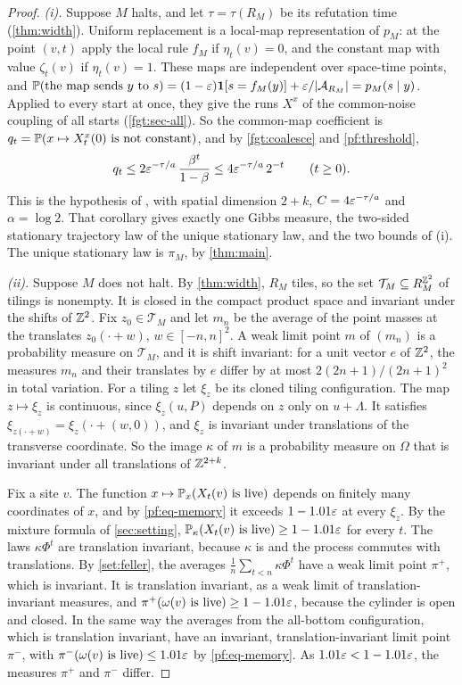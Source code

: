 \begin{proof}
\emph{(i).} Suppose $M$ halts, and let $\tau=\tau(R_M)$ be its refutation time (\cref{thm:width}). Uniform replacement is a local-map representation of $p_M$: at the point $(v,t)$ apply the local rule $f_M$ if $\eta_t(v)=0$, and the constant map with value $\zeta_t(v)$ if $\eta_t(v)=1$. These maps are independent over space-time points, and $\mathbb{P}(\text{the map sends }y\text{ to }s)=(1-\varepsilon)\mathbf 1[s=f_M(y)]+\varepsilon/|\mathcal{A}_{R_M}|=p_M(s\mid y)$. Applied to every start at once, they give the runs $X^x$ of the common-noise coupling of all starts (\cref{fgt:sec-all}). So the common-map coefficient is $q_t=\mathbb{P}(x\mapsto X^x_t(0)\text{ is not constant})$, and by \cref{fgt:coalesce} and \cref{pf:threshold},
\[
q_t\le2\varepsilon^{-\tau/a}\,\frac{\beta^t}{1-\beta}\le4\varepsilon^{-\tau/a}\,2^{-t}\qquad(t\ge0).
\]
This is the hypothesis of \cite[Corollary~13.7]{DM26}, with spatial dimension $2+k$, $C=4\varepsilon^{-\tau/a}$ and $\alpha=\log2$. That corollary gives exactly one Gibbs measure, the two-sided stationary trajectory law of the unique stationary law, and the two bounds of (i). The unique stationary law is $\pi_M$, by \cref{thm:main}.

\emph{(ii).} Suppose $M$ does not halt. By \cref{thm:width}, $R_M$ tiles, so the set $\mathcal T_M\subseteq R_M^{\mathbb{Z}^2}$ of tilings is nonempty. It is closed in the compact product space and invariant under the shifts of $\mathbb{Z}^2$. Fix $z_0\in\mathcal T_M$ and let $m_n$ be the average of the point masses at the translates $z_0(\cdot+w)$, $w\in[-n,n]^2$. A weak limit point $m$ of $(m_n)$ is a probability measure on $\mathcal T_M$, and it is shift invariant: for a unit vector $e$ of $\mathbb{Z}^2$, the measures $m_n$ and their translates by $e$ differ by at most $2(2n+1)/(2n+1)^2$ in total variation. For a tiling $z$ let $\xi_z$ be its cloned tiling configuration. The map $z\mapsto\xi_z$ is continuous, since $\xi_z(u,P)$ depends on $z$ only on $u+\Lambda$. It satisfies $\xi_{z(\cdot+w)}=\xi_z(\cdot+(w,0))$, and $\xi_z$ is invariant under translations of the transverse coordinate. So the image $\kappa$ of $m$ is a probability measure on $\Omega$ that is invariant under all translations of $\mathbb{Z}^{2+k}$.

Fix a site $v$. The function $x\mapsto\mathbb{P}_x(X_t(v)\text{ is live})$ depends on finitely many coordinates of $x$, and by \eqref{pf:eq-memory} it exceeds $1-1.01\varepsilon$ at every $\xi_z$. By the mixture formula of \cref{sec:setting}, $\mathbb{P}_\kappa(X_t(v)\text{ is live})\ge1-1.01\varepsilon$ for every $t$. The laws $\kappa\Phi^t$ are translation invariant, because $\kappa$ is and the process commutes with translations. By \cref{set:feller}, the averages $\frac1n\sum_{t<n}\kappa\Phi^t$ have a weak limit point $\pi^+$, which is invariant. It is translation invariant, as a weak limit of translation-invariant measures, and $\pi^+(\omega(v)\text{ is live})\ge1-1.01\varepsilon$, because the cylinder is open and closed. In the same way the averages from the all-bottom configuration, which is translation invariant, have an invariant, translation-invariant limit point $\pi^-$, with $\pi^-(\omega(v)\text{ is live})\le1.01\varepsilon$ by \eqref{pf:eq-memory}. As $1.01\varepsilon<1-1.01\varepsilon$, the measures $\pi^+$ and $\pi^-$ differ.


\end{proof}
